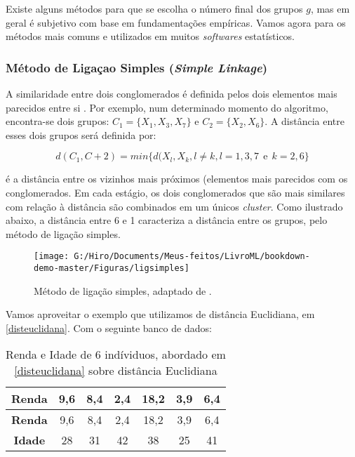 \documentclass[
  openany]{book}
\begin{document}
Existe alguns métodos para que se escolha o número final dos grupos \(g\), mas em geral é subjetivo com base em fundamentações empíricas. Vamos agora para os métodos mais comuns e utilizados em muitos \emph{softwares} estatísticos.

\hypertarget{muxe9todo-de-ligauxe7ao-simples-simple-linkage}{%
\subsubsection{\texorpdfstring{Método de Ligaçao Simples (\emph{Simple Linkage})}{Método de Ligaçao Simples (Simple Linkage)}}\label{muxe9todo-de-ligauxe7ao-simples-simple-linkage}}

A similaridade entre dois conglomerados é definida pelos dois elementos mais parecidos entre si \citep{sneath1957application}. Por exemplo, num determinado momento do algoritmo, encontra-se dois grupos: \(C_1=\{X_1,X_3,X_7\}\) e \(C_2=\{X_2,X_6\}\). A distância entre esses dois grupos será definida por:

\begin{equation}
    d(C_1,C+2)=min\{d(X_l,X_k, l\neq k, l=1,3,7 \ \ \mbox{e} \ \ k=2,6\}
    \label{eq:ligsimples}
\end{equation}

é a distância entre os vizinhos mais próximos (elementos mais parecidos com os conglomerados. Em cada estágio, os dois conglomerados que são mais similares com relação à distância são combinados em um únicos \emph{cluster}. Como ilustrado abaixo, a distância entre 6 e 1 caracteriza a distância entre os grupos, pelo método de ligação simples.

\begin{figure}

{\centering \texttt{[image: G:/Hiro/Documents/Meus-feitos/LivroML/bookdown-demo-master/Figuras/ligsimples]} 

}

\caption{Método de ligação simples, adaptado de \citet{mingoti2007analise}.}\label{fig:ligsimples}
\end{figure}



Vamos aproveitar o exemplo que utilizamos de distância Euclidiana, em \ref{disteuclidana}. Com o seguinte banco de dados:

\begin{longtable}[]{@{}ccccccc@{}}
\caption{\label{tab:dadossrenda} Renda e Idade de 6 indíviduos, abordado em \ref{disteuclidana} sobre distância Euclidiana \citep{mingoti2007analise}}\tabularnewline
\toprule
\textbf{Renda} & 9,6 & 8,4 & 2,4 & 18,2 & 3,9 & 6,4\tabularnewline
\midrule
\endfirsthead
\toprule
\textbf{Renda} & 9,6 & 8,4 & 2,4 & 18,2 & 3,9 & 6,4\tabularnewline
\midrule
\endhead
\textbf{Idade} & 28 & 31 & 42 & 38 & 25 & 41\tabularnewline
\bottomrule
\end{longtable}
\end{document}
